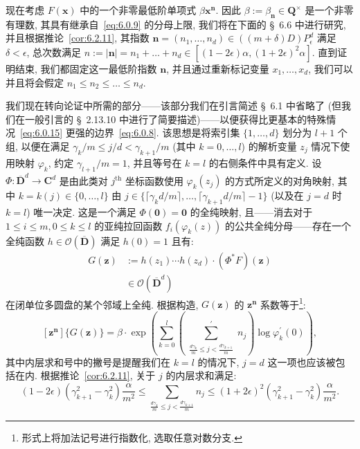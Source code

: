 现在考虑 $F(\mathbf{x})$ 中的一个非零最低阶单项式 $\beta \mathbf{x}^{\mathbf{n}}$.
因此 $\beta := \beta_{\mathbf{n}} \in \mathbf{Q}^{\times}$ 是一个非零有理数, 其具有继承自~\eqref{eq:6.0.9} 的分母上限, 我们将在下面的 \S~6.6 中进行研究, 并且根据推论~\ref{cor:6.2.11}, 其指数 $\mathbf{n} = (n_1, \ldots, n_d) \in ((m+\delta)D) P_{\epsilon}^d$ 满足 $\delta < \epsilon$, 总次数满足 $n := |\mathbf{n}| = n_1 + \dots + n_d \in [(1-2\epsilon)\alpha, (1+2\epsilon)^2\alpha]$.
直到证明结束, 我们都固定这一最低阶指数 $\mathbf{n}$, 并且通过重新标记变量 $x_1, \ldots, x_d$, 我们可以并且将会假定 $n_1 \leq n_2 \leq \dots \leq n_d$.

我们现在转向论证中所需的部分——该部分我们在引言简述 \S~6.1 中省略了 (但我们在一般引言的 \S~2.13.10 中进行了简要描述)——以便获得比更基本的特殊情况~\eqref{eq:6.0.15} 更强的边界~\eqref{eq:6.0.8}.
该思想是将索引集 $\{1,\ldots,d\}$ 划分为 $l+1$ 个组, 以便在满足 $\gamma_k/m \leq j/d < \gamma_{k+1}/m$ (其中 $k=0,\ldots,l$) 的解析变量 $z_j$ 情况下使用映射 $\varphi_k$, 约定 $\gamma_{l+1}/m=1$, 并且等号在 $k=l$ 的右侧条件中具有定义.
设 $\Phi:\overline{\mathbf{D}}^d\to\mathbf{C}^d$ 是由此类对 $j^{\text{th}}$ 坐标函数使用 $\varphi_k(z_j)$ 的方式所定义的对角映射, 其中 $k=k(j)\in\{0,\ldots,l\}$ 由 $j\in\{\lceil\gamma_kd/m\rceil,\ldots,\lceil\gamma_{k+1}d/m\rceil-1\}$ (以及在 $j=d$ 时 $k=l$) 唯一决定.
这是一个满足 $\Phi(\mathbf{0})=\mathbf{0}$ 的全纯映射, 且——消去对于 $1\le i\le m, 0\le k\le l$ 的亚纯拉回函数 $f_i(\varphi_k(z))$ 的公共全纯分母——存在一个全纯函数 $h \in \mathcal{O}(\overline{\mathbf{D}})$ 满足 $h(0)=1$ 且有:
\begin{equation}\label{eq:6.4.1}
\begin{aligned}
G(\mathbf{z}) &:= h(z_1) \cdots h(z_d) \cdot (\Phi^* F)(\mathbf{z}) \\
&\in \mathcal{O}\left(\overline{\mathbf{D}}^d\right)
\end{aligned}
\end{equation}
在闭单位多圆盘的某个邻域上全纯.
根据构造, $G(\mathbf{z})$ 的 $\mathbf{z}^{\mathbf{n}}$ 系数等于\footnote{形式上将加法记号进行指数化, 选取任意对数分支.}:
\begin{equation}\label{eq:6.4.2}
[\mathbf{z}^{\mathbf{n}}] \{ G(\mathbf{z}) \} = \beta \cdot \exp \left( \sum_{k=0}^{l} \left( \sum_{\substack{\frac{d\gamma_k}{m} \le j < \frac{d\gamma_{k+1}}{m}}}^{\prime} n_j \right) \log \varphi_k^{\prime}(0) \right),
\end{equation}
其中内层求和号中的撇号是提醒我们在 $k = l$ 的情况下, $j = d$ 这一项也应该被包括在内.
根据推论~\ref{cor:6.2.11}, 关于 $j$ 的内层求和满足:
\begin{equation}\label{eq:6.4.3}
(1 - 2\epsilon)(\gamma_{k+1}^2 - \gamma_k^2) \frac{\alpha}{m^2} \le \sum_{\frac{d\gamma_k}{m} \le j < \frac{d\gamma_{k+1}}{m}} n_j \le (1 + 2\epsilon)^2 (\gamma_{k+1}^2 - \gamma_k^2) \frac{\alpha}{m^2}.
\end{equation}

